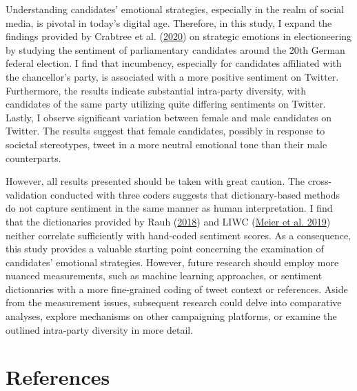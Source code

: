 \documentclass[a4paper,11pt]{article}
\begin{document}
Understanding candidates' emotional strategies, especially in the realm of social media, is pivotal in today's digital age. Therefore, in this study, I expand the findings provided by Crabtree et al. (\protect\hyperlink{ref-crabtreeItNotOnly2020}{2020}) on strategic emotions in electioneering by studying the sentiment of parliamentary candidates around the 20th German federal election. I find that incumbency, especially for candidates affiliated with the chancellor's party, is associated with a more positive sentiment on Twitter. Furthermore, the results indicate substantial intra-party diversity, with candidates of the same party utilizing quite differing sentiments on Twitter. Lastly, I observe significant variation between female and male candidates on Twitter. The results suggest that female candidates, possibly in response to societal stereotypes, tweet in a more neutral emotional tone than their male counterparts.

However, all results presented should be taken with great caution. The cross-validation conducted with three coders suggests that dictionary-based methods do not capture sentiment in the same manner as human interpretation. I find that the dictionaries provided by Rauh (\protect\hyperlink{ref-rauhValidatingSentimentDictionary2018}{2018}) and LIWC (\protect\hyperlink{ref-meierLIWCAufDeutsch2019}{Meier et al. 2019}) neither correlate sufficiently with hand-coded sentiment scores. As a consequence, this study provides a valuable starting point concerning the examination of candidates' emotional strategies. However, future research should employ more nuanced measurements, such as machine learning approaches, or sentiment dictionaries with a more fine-grained coding of tweet context or references. Aside from the measurement issues, subsequent research could delve into comparative analyses, explore mechanisms on other campaigning platforms, or examine the outlined intra-party diversity in more detail.

\hypertarget{references}{%
\section*{References}\label{references}}

\noindent

\setlength{\parindent}{-0.5cm}
\setlength{\leftskip}{0.5cm}
\setlength{\parskip}{8pt}
\end{document}
